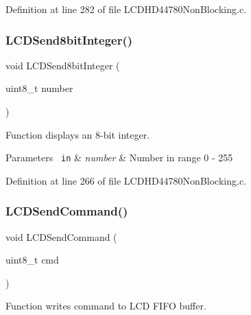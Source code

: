 Definition at line 282 of file L\+C\+D\+H\+D44780\+Non\+Blocking.\+c.

\mbox{\label{group___l_c_d_h_d44780_non_blocking_gaf43a1b2f3c74fb30ccf5516f8d0953c5_gaf43a1b2f3c74fb30ccf5516f8d0953c5}} 
\subsubsection{\texorpdfstring{LCDSend8bitInteger()}{LCDSend8bitInteger()}}
{\footnotesize\ttfamily void L\+C\+D\+Send8bit\+Integer (\begin{DoxyParamCaption}\item[{uint8\+\_\+t}]{number }\end{DoxyParamCaption})}



Function displays an 8-\/bit integer. 


\begin{DoxyParams}[1]{Parameters}
\mbox{\texttt{ in}}  & {\em number} & Number in range 0 -\/ 255 \\
\hline
\end{DoxyParams}


Definition at line 266 of file L\+C\+D\+H\+D44780\+Non\+Blocking.\+c.

\mbox{\label{group___l_c_d_h_d44780_non_blocking_ga73568e70866ca81b92b34ce8a65a01e4_ga73568e70866ca81b92b34ce8a65a01e4}} 
\subsubsection{\texorpdfstring{LCDSendCommand()}{LCDSendCommand()}}
{\footnotesize\ttfamily void L\+C\+D\+Send\+Command (\begin{DoxyParamCaption}\item[{uint8\+\_\+t}]{cmd }\end{DoxyParamCaption})}



Function writes command to L\+CD F\+I\+FO buffer. 


